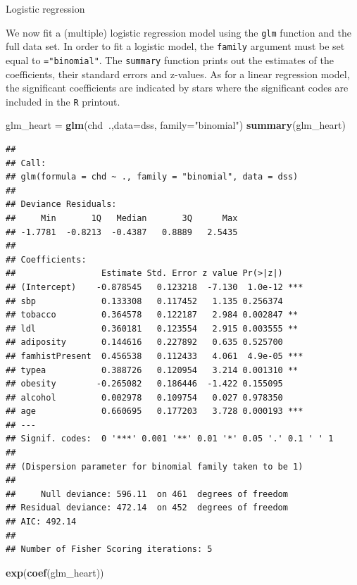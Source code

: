 \documentclass[
  ignorenonframetext,
]{beamer}
\newenvironment{Shaded}{\begin{snugshade}}{\end{snugshade}}
\newcommand{\DataTypeTok}[1]{\textcolor[rgb]{0.13,0.29,0.53}{#1}}
\newcommand{\KeywordTok}[1]{\textcolor[rgb]{0.13,0.29,0.53}{\textbf{#1}}}
\newcommand{\NormalTok}[1]{#1}
\newcommand{\OperatorTok}[1]{\textcolor[rgb]{0.81,0.36,0.00}{\textbf{#1}}}
\newcommand{\StringTok}[1]{\textcolor[rgb]{0.31,0.60,0.02}{#1}}
\begin{document}
\begin{frame}[fragile]

\begin{block}{Logistic regression}

We now fit a (multiple) logistic regression model using the \texttt{glm}
function and the full data set. In order to fit a logistic model, the
\texttt{family} argument must be set equal to \texttt{="binomial"}. The
\texttt{summary} function prints out the estimates of the coefficients,
their standard errors and z-values. As for a linear regression model,
the significant coefficients are indicated by stars where the
significant codes are included in the \texttt{R} printout.

\begin{Shaded}
\begin{Highlighting}[]
\NormalTok{glm_heart =}\StringTok{ }\KeywordTok{glm}\NormalTok{(chd}\OperatorTok{~}\NormalTok{.,}\DataTypeTok{data=}\NormalTok{dss, }\DataTypeTok{family=}\StringTok{"binomial"}\NormalTok{)}
\KeywordTok{summary}\NormalTok{(glm_heart)}
\end{Highlighting}
\end{Shaded}

\begin{verbatim}
## 
## Call:
## glm(formula = chd ~ ., family = "binomial", data = dss)
## 
## Deviance Residuals: 
##     Min       1Q   Median       3Q      Max  
## -1.7781  -0.8213  -0.4387   0.8889   2.5435  
## 
## Coefficients:
##                 Estimate Std. Error z value Pr(>|z|)    
## (Intercept)    -0.878545   0.123218  -7.130  1.0e-12 ***
## sbp             0.133308   0.117452   1.135 0.256374    
## tobacco         0.364578   0.122187   2.984 0.002847 ** 
## ldl             0.360181   0.123554   2.915 0.003555 ** 
## adiposity       0.144616   0.227892   0.635 0.525700    
## famhistPresent  0.456538   0.112433   4.061  4.9e-05 ***
## typea           0.388726   0.120954   3.214 0.001310 ** 
## obesity        -0.265082   0.186446  -1.422 0.155095    
## alcohol         0.002978   0.109754   0.027 0.978350    
## age             0.660695   0.177203   3.728 0.000193 ***
## ---
## Signif. codes:  0 '***' 0.001 '**' 0.01 '*' 0.05 '.' 0.1 ' ' 1
## 
## (Dispersion parameter for binomial family taken to be 1)
## 
##     Null deviance: 596.11  on 461  degrees of freedom
## Residual deviance: 472.14  on 452  degrees of freedom
## AIC: 492.14
## 
## Number of Fisher Scoring iterations: 5
\end{verbatim}

\begin{Shaded}
\begin{Highlighting}[]
\KeywordTok{exp}\NormalTok{(}\KeywordTok{coef}\NormalTok{(glm_heart))}
\end{Highlighting}
\end{Shaded}


\end{block}
\end{frame}
\end{document}

